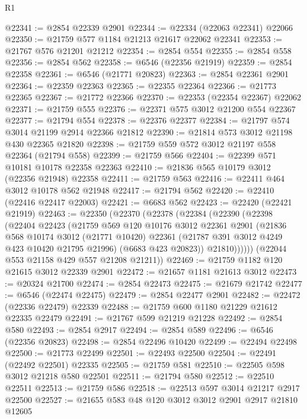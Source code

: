 \begin{lexlean}{R1}
\begin{coremodule}
@22341 := @2854 @22339 @2901
@22344 := @22334 (@22063 @22341) @22066
@22350 := @21759 @577 @1184 @21213 @21617 @22062 @22341
@22353 := @21767 @576 @21201 @21212
@22354 := @2854 @554
@22355 := @2854 @558
@22356 := @2854 @562
@22358 := @6546 (@22356 @21919)
@22359 := @2854 @22358
@22361 := @6546 (@21771 @20823)
@22363 := @2854 @22361 @2901
@22364 := @22359 @22363
@22365 := @22355 @22364
@22366 := @21773 @22365
@22367 := @21772 @22366
@22370 := @22353 (@22354 @22367) @22062
@22371 := @21759 @555
@22376 := @22371 @575 @3012 @21200 @554 @22367
@22377 := @21794 @554
@22378 := @22376 @22377
@22384 := @21797 @574 @3014 @21199 @2914 @22366 @21812
@22390 := @21814 @573 @3012 @21198 @430 @22365 @21820
@22398 := @21759 @559 @572 @3012 @21197 @558 @22364 (@21794 @558)
@22399 := @21759 @566
@22404 := @22399 @571 @10181 @10178 @22358 @22363
@22410 := @21836 @565 @10179 @3012 (@22356 @21948) @22358
@22411 := @21759 @563
@22416 := @22411 @464 @3012 @10178 @562 @21948
@22417 := @21794 @562
@22420 := @22410 (@22416 @22417 @22003)
@22421 := @6683 @562
@22423 := @22420 (@22421 @21919)
@22463 := @22350
    (@22370
      (@22378
        (@22384
          (@22390
            (@22398
              (@22404
                @22423
                (@21759
                  @569
                  @120
                  @10176
                  @3012
                  @22361
                  @2901
                  (@21836
                    @568
                    @10174
                    @3012
                    (@21771 @10420)
                    @22361
                    (@21787 @391 @3012 @4249 @423 @10420 @21795 @21996)
                    (@6683 @423 @20823))
                  @21810))))))
      (@22044 @553 @21158 @429 @557 @21208 @21211))
@22469 := @21759 @1182 @120 @21615 @3012 @22339 @2901
@22472 := @21657 @1181 @21613 @3012
@22473 := @20324 @21700
@22474 := @2854 @22473
@22475 := @21679 @21742
@22477 := @6546 (@22474 @22475)
@22479 := @2854 @22477 @2901
@22482 := @22472 (@22336 @22479) @22339
@22488 := @21759 @600 @1180 @21229 @21612 @22335 @22479
@22491 := @21767 @599 @21219 @21228
@22492 := @2854 @580
@22493 := @2854 @2917
@22494 := @2854 @589
@22496 := @6546 (@22356 @20823)
@22498 := @2854 @22496 @10420
@22499 := @22494 @22498
@22500 := @21773 @22499
@22501 := @22493 @22500
@22504 := @22491 (@22492 @22501) @22335
@22505 := @21759 @581
@22510 := @22505 @598 @3012 @21218 @580 @22501
@22511 := @21794 @580
@22512 := @22510 @22511
@22513 := @21759 @586
@22518 := @22513 @597 @3014 @21217 @2917 @22500
@22527 := @21655 @583 @48 @120 @3012 @3012 @2901 @2917 @21810 @12605

\end{coremodule}
\end{lexlean}
